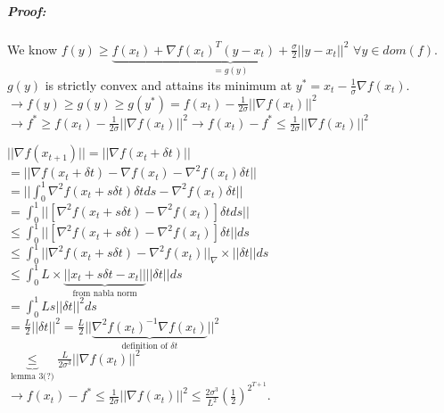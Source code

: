 \documentclass[main]{subfiles}
\begin{document}
\subparagraph{Proof:}
We know $f(y) \geq \underbrace{f(x_t) + \nabla f(x_t)^T(y-x_t) +
\frac{\sigma}{2} ||y - x_t||^2}_{= g(y)}$ $\forall y \in dom(f)$.\\
$g(y)$ is strictly convex and attains its minimum at
$y^* = x_t - \frac{1}{\sigma} \nabla f(x_t)$.\\
$\rightarrow f(y) \geq g(y) \geq g(y^*) = f(x_t) - \frac{1}{2 \sigma}
||\nabla f(x_t)||^2$\\
$\rightarrow f^* \geq f(x_t) - \frac{1}{2 \sigma}||\nabla f(x_t)||^2
\rightarrow f(x_t) - f^* \leq \frac{1}{2 \sigma}||\nabla f(x_t)||^2$

$||\nabla f(x_{t+1})|| = ||\nabla f(x_t + \delta t)||$\\
$= ||\nabla f(x_t + \delta t) - \nabla f(x_t) - \nabla^2 f(x_t) \delta t ||$\\
$= || \int_{0}^{1} \nabla^2 f(x_t + s \delta t) \delta t ds - \nabla^2 f(x_t)
\delta t||$\\
$= \int_{0}^{1} ||[ \nabla^2 f(x_t + s \delta t) - \nabla^2 f(x_t) ] \delta t
ds||$\\
$\leq \int_{0}^{1} ||[\nabla^2 f(x_t + s\delta t) - \nabla^2 f(x_t)] \delta t||
ds$\\
$\leq \int_{0}^{1} ||\nabla^2 f(x_t + s\delta t) - \nabla^2 f(x_t)||_\nabla
\times ||\delta t|| ds$\\
$\leq \int_{0}^{1} L \times \underbrace{||x_t + s\delta t - x_t||}_{\text{from
nabla norm}} || \delta t|| ds$\\
$= \int_0^1 L s ||\delta t||^2 ds$ \\
$= \frac{L}{2} || \delta t||^2 = \frac{L}{2} || \underbrace{\nabla^2
f(x_t)^{-1} \nabla f(x_t)}_{\text{definition of $\delta t$}} ||^2$\\
$\underbrace{\leq}_{\text{lemma 3(?)}} \frac{L}{2 \sigma^3}
||\nabla f(x_t)||^2$\\
$\rightarrow f(x_t) - f^* \leq \frac{1}{2 \sigma} ||\nabla f(x_t)||^2 \leq
\frac{2 \sigma^3}{L^2} (\frac{1}{2})^{2^{T+1}}$.
\end{document}
